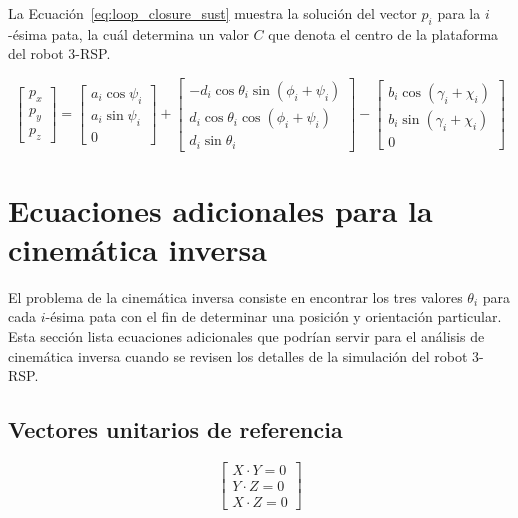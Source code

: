 \documentclass[titlepage, letterpaper, fleqn]{article}
\begin{document}
La Ecuación~\ref{eq:loop_closure_sust} muestra la solución del vector $p_i$ para la $i$-ésima pata,
la cuál determina un valor $C$ que denota el centro de la plataforma del robot 3-RSP.

\begin{equation}
    \label{eq:loop_closure_sust}
    \begin{bmatrix}
    p_x \\
    p_y \\
    p_z
    \end{bmatrix}
    =
    \begin{bmatrix}
    a_i\cos\psi_i \\
    a_i\sin\psi_i \\
    0
    \end{bmatrix}
    +
    \begin{bmatrix}
    -d_i \cos \theta_i \sin(\phi_i + \psi_i) \\
    d_i \cos \theta_i \cos(\phi_i + \psi_i) \\
    d_i \sin \theta_i
    \end{bmatrix}
    -
    \begin{bmatrix}
    b_i \cos(\gamma_i + \chi_i) \\
    b_i \sin(\gamma_i + \chi_i) \\
    0
    \end{bmatrix}
\end{equation}


\section{Ecuaciones adicionales para la cinemática inversa} %
\label{sec:extra_eqs}

El problema de la cinemática inversa consiste en encontrar los tres valores $\theta_i$ para cada $i$-ésima pata con el fin de determinar una posición y orientación particular.
Esta sección lista ecuaciones adicionales que podrían servir para el análisis de cinemática inversa cuando se revisen los detalles de la simulación del robot 3-RSP.

\subsection{Vectores unitarios de referencia} %
\label{subsec:ref_unit_vectors}

\begin{equation}
    \label{eq:dot_unit_vectors}
    \begin{bmatrix}
    X \cdot Y = 0 \\
    Y \cdot Z = 0 \\
    X \cdot Z = 0
    \end{bmatrix}
\end{equation}
\end{document}
